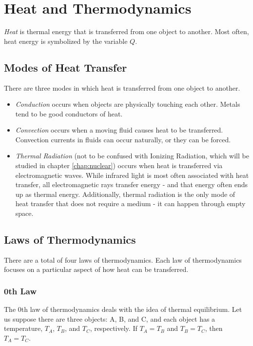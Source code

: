 \chapter{Heat and Thermodynamics}

	\textit{Heat} is thermal energy that is transferred from one object to another.  Most often, heat energy is symbolized by the variable $Q$.  
	\section{Modes of Heat Transfer}
	There are three modes in which heat is transferred from one object to another.   \begin{itemize}
		\item \textit{Conduction} occurs when objects are physically touching each other.  Metals tend to be good conductors of heat. 
		\item   \textit{Convection} occurs when a moving fluid causes heat to be transferred.  Convection currents in fluids can occur naturally, or they can be forced. 
		\item  \textit{Thermal Radiation} (not to be confused with Ionizing Radiation, which will be studied in chapter \ref{chap:nuclear}) occurs when heat is transferred via electromagnetic waves.  While infrared light is most often associated with heat transfer, all electromagnetic rays transfer energy - and that energy often ends up as thermal energy.  Additionally, thermal radiation is the only mode of heat transfer that does not require a medium - it can happen through empty space.
		\end{itemize}
	
	\section{Laws of Thermodynamics}
	
	There are a total of four laws of thermodynamics.  Each law of thermodynamics focuses on a particular aspect of how heat can be transferred. 
	
	\subsection{0th Law}
	
	The 0th law of thermodynamics deals with the idea of thermal equilibrium.  Let us suppose there are three objects: A, B, and C, and each object has a temperature, $T_A$, $T_B$, and $T_C$, respectively.  If $T_A = T_B$ and $T_B = T_C$, then $T_A = T_C$.  
	
